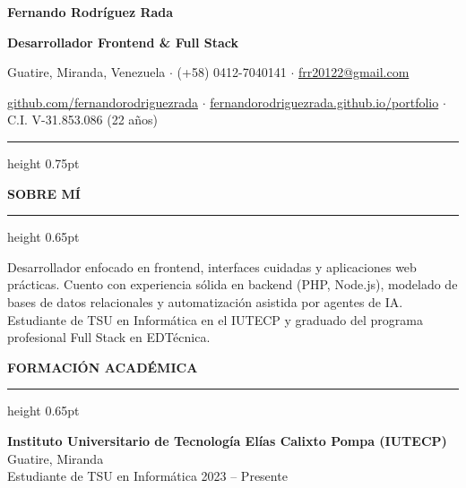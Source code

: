 \documentclass[11pt,letterpaper]{article}
\newcommand{\cvsection}[1]{%
  \vspace{4pt}%
  {\color{primarydark}\textbf{\small\bfseries #1}}%
  \par\vspace{1.2pt}%
  {\color{rulebeige}\hrule height 0.65pt}%
  \vspace{2.5pt}%
}
\begin{document}
\color{textdark}

\begin{center}
  {\fontsize{18}{21}\selectfont\textbf{\color{primarydark} Fernando Rodríguez Rada}}
  \par\vspace{1.5pt}
  {\color{primary}\textbf{\small Desarrollador Frontend \& Full Stack}}
  \par\vspace{2.5pt}
  {\footnotesize
    Guatire, Miranda, Venezuela \enspace $\cdot$ \enspace
    (+58) 0412-7040141 \enspace $\cdot$ \enspace
    \href{mailto:frr20122@gmail.com}{frr20122@gmail.com}
  }
  \par\vspace{1.5pt}
  {\footnotesize
    \href{https://github.com/fernandorodriguezrada}{github.com/fernandorodriguezrada} \enspace $\cdot$ \enspace
    \href{https://fernandorodriguezrada.github.io/portfolio/}{fernandorodriguezrada.github.io/portfolio} \enspace $\cdot$ \enspace
    {\color{textmuted}C.I. V-31.853.086 (22 años)}
  }
  \par\vspace{5pt}
  {\color{rulebeige}\hrule height 0.75pt}
\end{center}
\vspace{1pt}

\cvsection{SOBRE MÍ}
Desarrollador enfocado en frontend, interfaces cuidadas y aplicaciones web prácticas. Cuento con experiencia sólida en backend (PHP, Node.js), modelado de bases de datos relacionales y automatización asistida por agentes de IA. Estudiante de TSU en Informática en el IUTECP y graduado del programa profesional Full Stack en EDTécnica.

\cvsection{FORMACIÓN ACADÉMICA}

\textbf{Instituto Universitario de Tecnología Elías Calixto Pompa (IUTECP)} \hfill {\footnotesize\color{textmuted} Guatire, Miranda}\\
Estudiante de TSU en Informática \hfill {\footnotesize\color{textmuted} 2023 -- Presente}
\end{document}
